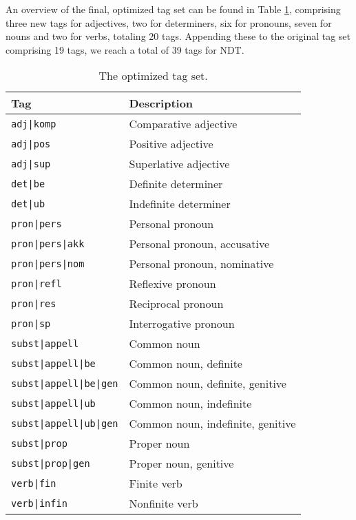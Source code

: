 \documentclass[a4paper,12pt,english]{book}
\begin{document}
An overview of the final, optimized tag set can be found in Table
\ref{optimizedtagset}, comprising three new tags for adjectives, two for
determiners, six for pronouns, seven for nouns and two for verbs, totaling 20
tags. Appending these to the original tag set comprising 19 tags, we reach a
total of 39 tags for NDT.

\begin{table}
    \centering
    \smaller[0.5]
    \begin{tabular}{@{}ll@{}}
        \toprule
        \textbf{Tag} & \textbf{Description} \\
        \midrule
        \texttt{adj|komp} & Comparative adjective \\
        \texttt{adj|pos} & Positive adjective \\
        \texttt{adj|sup} & Superlative adjective \\
        \texttt{det|be} & Definite determiner \\
        \texttt{det|ub} & Indefinite determiner \\
        \texttt{pron|pers} & Personal pronoun \\
        \texttt{pron|pers|akk} & Personal pronoun, accusative \\
        \texttt{pron|pers|nom} & Personal pronoun, nominative \\
        \texttt{pron|refl} & Reflexive pronoun \\
        \texttt{pron|res} & Reciprocal pronoun \\
        \texttt{pron|sp} & Interrogative pronoun \\
        \texttt{subst|appell} & Common noun \\
        \texttt{subst|appell|be} & Common noun, definite \\
        \texttt{subst|appell|be|gen} & Common noun, definite, genitive \\
        \texttt{subst|appell|ub} & Common noun, indefinite \\
        \texttt{subst|appell|ub|gen} & Common noun, indefinite, genitive \\
        \texttt{subst|prop} & Proper noun \\
        \texttt{subst|prop|gen} & Proper noun, genitive \\
        \texttt{verb|fin} & Finite verb \\
        \texttt{verb|infin} & Nonfinite verb \\
        \bottomrule
    \end{tabular}
    \caption{The optimized tag set.}
    \label{optimizedtagset}
\end{table}
\end{document}
